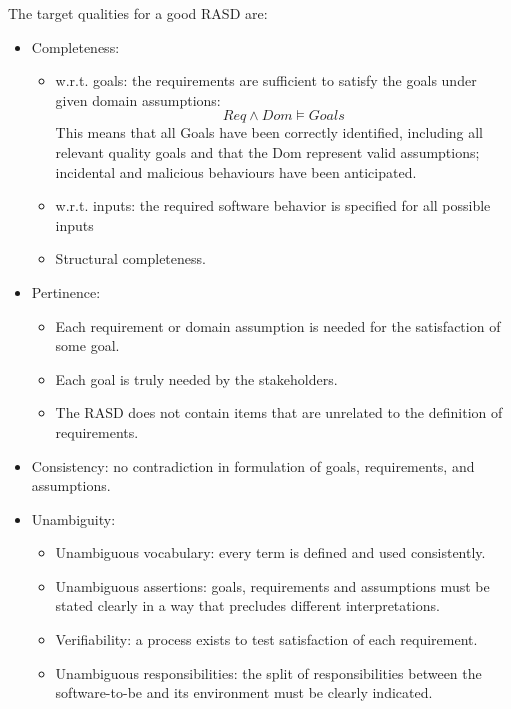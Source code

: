 \documentclass[12pt, a4paper]{report}
\begin{document}
        The target qualities for a good RASD are: 
        \begin{itemize}
            \item Completeness:
            \begin{itemize}
                \item w.r.t. goals: the requirements are sufficient to satisfy the goals under given domain assumptions: 
                \[Req \land Dom \models Goals\]
                This means that all Goals have been correctly identified, including all relevant quality goals and that the Dom represent valid assumptions; incidental and malicious behaviours have been anticipated. 
                \item w.r.t. inputs: the required software behavior is specified for all possible inputs
                \item Structural completeness. 
            \end{itemize}
            \item Pertinence: 
            \begin{itemize}
                \item Each requirement or domain assumption is needed for the satisfaction of some goal. 
                \item Each goal is truly needed by the stakeholders. 
                \item The RASD does not contain items that are unrelated to the definition of requirements.
            \end{itemize}
            \item Consistency: no contradiction in formulation of goals, requirements, and assumptions. 
            \item Unambiguity: 
            \begin{itemize}
                \item Unambiguous vocabulary: every term is defined and used consistently.
                \item Unambiguous assertions: goals, requirements and assumptions must be stated clearly in a way that precludes different interpretations.
                \item Verifiability: a process exists to test satisfaction of each requirement.
                \item Unambiguous responsibilities: the split of responsibilities between the software-to-be and its environment must be clearly indicated. 
            \end{itemize}

\end{itemize}
\end{document}
